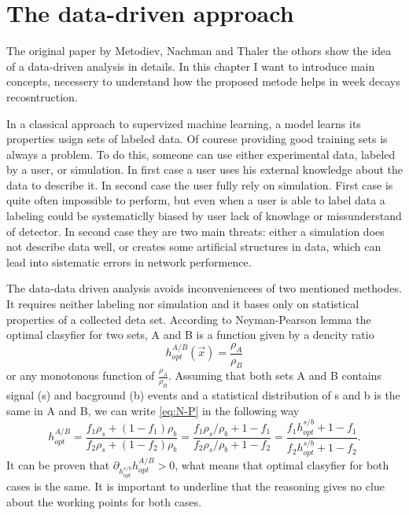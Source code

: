 \section{The data-driven approach}
The original paper by Metodiev, Nachman and Thaler \cite{Metodiev_2017} the othors show the idea of a data-driven analysis in details. In this chapter I want to introduce main concepts, necessery to understand how the proposed metode helps in week decays recosntruction.

In a classical approach to supervized machine learning, a model learns its properties usign sets of labeled data. Of courese providing good training sets is always a problem. To do this, someone can use either experimental data, labeled by a user, or simulation. In first case a user uses his external knowledge about the data to describe it. In second case the user fully rely on simulation. First case is quite often impossible to perform, but even when a user is able to label data a labeling could be systematiclly biased by user lack of knowlage or missunderstand of detector. In second case they are two main threats: either a simulation does not describe data well, or creates some artificial structures in data, which can lead into sistematic errors in network performence. 

The data-data driven analysis avoids inconveniencees of two mentioned methodes. It requires neither labeling nor simulation and it bases only on statistical properties of a collected deta set. According to Neyman-Pearson lemma \cite{Neyman-Pearson} the optimal clasyfier for two sets, A and B is a function given by a dencity ratio
\begin{equation}
  \label{eq:N-P}
  h_{opt}^{A/B}(\vec x)=\frac{\rho_A}{\rho_B}
\end{equation}
or any monotonous function of $\frac{\rho_A}{\rho_B}$. Assuming that both sets A and B contains signal (s) and bacground (b) events and a statistical distribution of s and b is the same in A and B, we can write \eqref{eq:N-P} in the following way
\begin{equation}
  h^{A/B}_{opt}=\frac{f_1 \rho_s + (1-f_1) \rho_b}{f_2 \rho_s + (1-f_2) \rho_b}=\frac{f_1 \rho_s/\rho_b+1-f_1}{f_2 \rho_s/\rho_b+1-f_2}=\frac{f_1 h_{opt}^{s/b}+1-f_1}{f_2 h_{opt}^{s/b} +1-f_2}.
\end{equation}
It can be proven that $\partial_{h_{opt}^{s/b}}h_{opt}^{A/B} >0$, what means that optimal clasyfier for both cases is the same. It is important to underline that the reasoning gives no clue about the working points for both cases.

